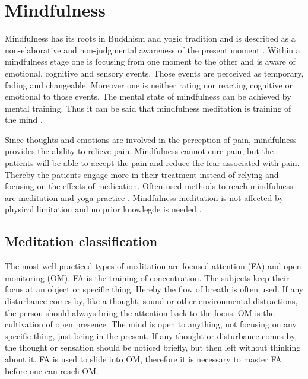 \section{Mindfulness}
Mindfulness has its roots in Buddhism and yogic tradition and is described as a non-elaborative and non-judgmental awareness of the present moment \cite{Zeidan2016, Kabat1982, Zeidan2012,Tang2017}. Within a mindfulness stage one is focusing from one moment to the other and is aware of emotional, cognitive and sensory events. Those events are perceived as temporary, fading and changeable. Moreover one is neither rating nor reacting cognitive or emotional to those events. The mental state of mindfulness can be achieved by mental training. \cite{Zeidan2016, Zeidan2012}  Thus it can be said that mindfulness meditation is training of the mind \cite{Tang2017}. 

Since thoughts and emotions are involved in the perception of pain, mindfulness provides the ability to relieve pain. Mindfulness cannot cure pain, but the patients will be able to accept the pain and reduce the fear associated with pain. Thereby the patients engage more in their treatment instead of relying and focusing on the effects of medication. \cite{Jacob2016} Often used methods to reach mindfulness are meditation and yoga practice \cite{Kabat1982}.  Mindfulness meditation is not affected by physical limitation and no prior knowlegde is needed \cite{Tang2017}.


\subsection{Meditation classification}
The most well practiced types of meditation are focused attention (FA) and open monitoring (OM). \cite{Zeidan2016} FA is the training of concentration. The subjects keep their focus at an object or specific thing. Hereby the flow of breath is often used.  If any disturbance comes by, like a thought, sound or other environmental distractions, the person should always bring the attention back to the focus. \cite{Zeidan2016} OM is the cultivation of open presence. The mind is open to anything, not focusing on any specific thing, just being in the present. If any thought or disturbance comes by, the thought or sensation should be noticed briefly, but then left without thinking about it. FA is used to slide into OM, therefore it is necessary to master FA before one can reach OM. \cite{Perlman2010, Zeidan2016, Kabat1982} 


